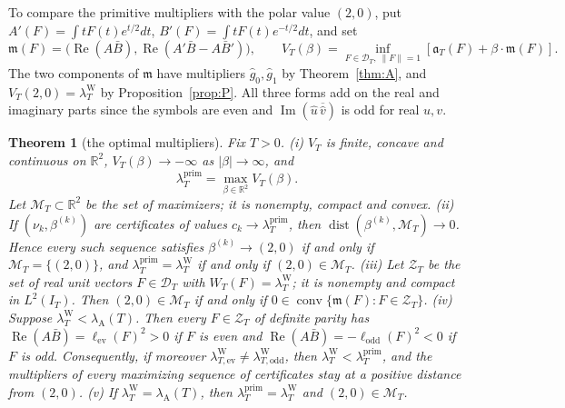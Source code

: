 \documentclass[10pt]{amsart}
\newtheorem{theorem}{Theorem}[section]
\theoremstyle{definition}
\theoremstyle{remark}
\newcommand{\R}{\mathbb R}
\newcommand{\Rel}{\operatorname{Re}}
\newcommand{\Iml}{\operatorname{Im}}
\newcommand{\IT}{I_T}
\newcommand{\lamP}{\lambda^{\mathrm{prim}}_T}
\newcommand{\lamW}{\lambda^{\mathrm W}_T}
\newcommand{\lamA}{\lambda_{\mathrm A}(T)}
\newcommand{\gh}[1]{\widehat g_{#1}}
\begin{document}
To compare the primitive multipliers with the polar value $(2,0)$, put
$A'(F)=\int tF(t)e^{t/2}dt$, $B'(F)=\int tF(t)e^{-t/2}dt$, and set
\[
 \mathfrak m(F)=\big(\Rel(A\bar B),\Rel(A'\bar B-A\bar B')\big),\qquad
 V_T(\beta)=\inf_{F\in\mathcal D_T,\ \|F\|=1}
       [\mathfrak a_T(F)+\beta\cdot\mathfrak m(F)] .
\]
The two components of $\mathfrak m$ have multipliers $\gh0,\gh1$ by
Theorem~\ref{thm:A}, and $V_T(2,0)=\lamW$ by Proposition~\ref{prop:P}.
All three forms add on the real and imaginary parts since the symbols
are even and $\Iml(\widehat u\,\overline{\widehat v})$ is odd for real $u,v$.

\begin{theorem}[the optimal multipliers]\label{thm:mult}
Fix $T>0$.
\emph{(i)} $V_T$ is finite, concave and continuous on $\R^2$, $V_T(\beta)\to-\infty$ as $|\beta|\to\infty$, and
\[
\lamP=\max_{\beta\in\R^2}V_T(\beta).
\]
Let $\mathcal M_T\subset\R^2$ be the set of maximizers; it is nonempty, compact and convex.
\emph{(ii)} If $(\nu_k,\beta^{(k)})$ are certificates of values $c_k\to\lamP$, then
$\operatorname{dist}(\beta^{(k)},\mathcal M_T)\to0$. Hence every such sequence satisfies $\beta^{(k)}\to(2,0)$ if and
only if $\mathcal M_T=\{(2,0)\}$, and $\lamP=\lamW$ if and only if $(2,0)\in\mathcal M_T$.
\emph{(iii)} Let $\mathcal Z_T$ be the set of real unit vectors $F\in\mathcal D_T$ with $W_T(F)=\lamW$; it is nonempty
and compact in $L^2(\IT)$. Then $(2,0)\in\mathcal M_T$ if and only if
$0\in\operatorname{conv}\{\mathfrak m(F):F\in\mathcal Z_T\}$.
\emph{(iv)} Suppose $\lamW<\lamA$. Then every $F\in\mathcal Z_T$ of definite parity has
$\Rel(A\bar B)=\ell_{\mathrm{ev}}(F)^2>0$ if $F$ is even and $\Rel(A\bar B)=-\ell_{\mathrm{odd}}(F)^2<0$ if $F$ is odd.
Consequently, if moreover $\lambda^{\mathrm W}_{T,\mathrm{ev}}\ne\lambda^{\mathrm W}_{T,\mathrm{odd}}$, then $\lamW<\lamP$, and
the multipliers of every maximizing sequence of certificates stay at a positive distance from $(2,0)$.
\emph{(v)} If $\lamW=\lamA$, then $\lamP=\lamW$ and $(2,0)\in\mathcal M_T$.
\end{theorem}
\end{document}
